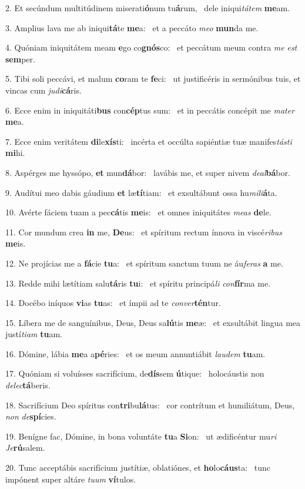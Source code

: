 2. Et secúndum multitúdinem miserati\textbf{ó}num tu\textbf{á}rum, \ast\  dele iniqui\textit{tá}\textit{tem} \textbf{me}am.\

3. Amplius lava me ab iniqui\textbf{tá}te \textbf{me}a: \ast\  et a peccáto \textit{me}\textit{o} \textbf{mun}da me.\

4. Quóniam iniquitátem meam \textbf{e}go co\textbf{gnós}co: \ast\  et peccátum meum contra \textit{me} \textit{est} \textbf{sem}per.\

5. Tibi soli peccávi, et malum \textbf{co}ram te \textbf{fe}ci: \ast\  ut justificéris in sermónibus tuis, et vincas cum \textit{ju}\textit{di}\textbf{cá}ris.\

6. Ecce enim in iniquitáti\textbf{bus} con\textbf{cép}tus sum: \ast\  et in peccátis concépit me \textit{ma}\textit{ter} \textbf{me}a.\

7. Ecce enim veritátem \textbf{di}le\textbf{xís}ti: \ast\  incérta et occúlta sapiéntiæ tuæ manifes\textit{tás}\textit{ti} \textbf{mi}hi.\

8. Aspérges me hyssópo, \textbf{et} mun\textbf{dá}bor: \ast\  lavábis me, et super nivem \textit{de}\textit{al}\textbf{bá}bor.\

9. Audítui meo dabis gáudium \textbf{et} læ\textbf{tí}tiam: \ast\  et exsultábunt ossa hu\textit{mi}\textit{li}\textbf{á}ta.\

10. Avérte fáciem tuam a pec\textbf{cá}tis \textbf{me}is: \ast\  et omnes iniquitátes \textit{me}\textit{as} \textbf{de}le.\

11. Cor mundum crea \textbf{in} me, \textbf{De}us: \ast\  et spíritum rectum ínnova in viscé\textit{ri}\textit{bus} \textbf{me}is.\

12. Ne projícias me a \textbf{fá}cie \textbf{tu}a: \ast\  et spíritum sanctum tuum ne áu\textit{fe}\textit{ras} \textbf{a} me.\

13. Redde mihi lætítiam salu\textbf{tá}ris \textbf{tu}i: \ast\  et spíritu principá\textit{li} \textit{con}\textbf{fír}ma me.\

14. Docébo iníquos \textbf{vi}as \textbf{tu}as: \ast\  et ímpii ad te \textit{con}\textit{ver}\textbf{tén}tur.\

15. Líbera me de sanguínibus, Deus, Deus sa\textbf{lú}tis \textbf{me}æ: \ast\  et exsultábit lingua mea justí\textit{ti}\textit{am} \textbf{tu}am.\

16. Dómine, lábia \textbf{me}a a\textbf{pé}ries: \ast\  et os meum annuntiábit \textit{lau}\textit{dem} \textbf{tu}am.\

17. Quóniam si voluísses sacrifícium, de\textbf{dís}sem \textbf{ú}tique: \ast\  holocáustis non \textit{de}\textit{lec}\textbf{tá}beris.\

18. Sacrifícium Deo spíritus con\textbf{tri}bu\textbf{lá}tus: \ast\  cor contrítum et humiliátum, Deus, \textit{non} \textit{de}\textbf{spí}cies.\

19. Benígne fac, Dómine, in bona voluntáte \textbf{tu}a \textbf{Si}on: \ast\  ut ædificéntur mu\textit{ri} \textit{Je}\textbf{rú}salem.\

20. Tunc acceptábis sacrifícium justítiæ, oblatiónes, et \textbf{ho}lo\textbf{cáus}ta: \ast\  tunc impónent super altáre \textit{tu}\textit{um} \textbf{ví}tulos.\


